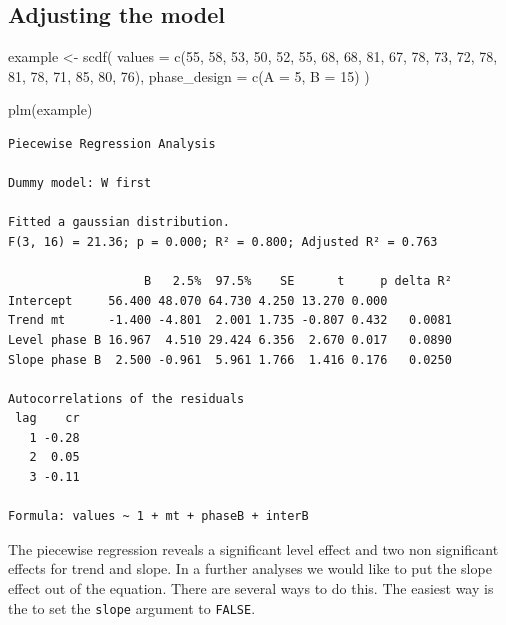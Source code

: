 \documentclass[
  letterpaper,
  DIV=11,
  numbers=noendperiod]{scrreprt}
\newenvironment{Shaded}{\begin{snugshade}}{\end{snugshade}}
\newcommand{\AttributeTok}[1]{\textcolor[rgb]{0.40,0.45,0.13}{#1}}
\newcommand{\DecValTok}[1]{\textcolor[rgb]{0.68,0.00,0.00}{#1}}
\newcommand{\FunctionTok}[1]{\textcolor[rgb]{0.28,0.35,0.67}{#1}}
\newcommand{\NormalTok}[1]{\textcolor[rgb]{0.00,0.23,0.31}{#1}}
\newcommand{\OtherTok}[1]{\textcolor[rgb]{0.00,0.23,0.31}{#1}}
\begin{document}
\hypertarget{adjusting-the-model}{%
\subsection{Adjusting the model}\label{adjusting-the-model}}

\begin{Shaded}
\begin{Highlighting}[]
\NormalTok{example }\OtherTok{\textless{}{-}} \FunctionTok{scdf}\NormalTok{(}
   \AttributeTok{values =} \FunctionTok{c}\NormalTok{(}\DecValTok{55}\NormalTok{, }\DecValTok{58}\NormalTok{, }\DecValTok{53}\NormalTok{, }\DecValTok{50}\NormalTok{, }\DecValTok{52}\NormalTok{, }\DecValTok{55}\NormalTok{, }\DecValTok{68}\NormalTok{, }\DecValTok{68}\NormalTok{, }\DecValTok{81}\NormalTok{, }\DecValTok{67}\NormalTok{, }\DecValTok{78}\NormalTok{, }\DecValTok{73}\NormalTok{, }\DecValTok{72}\NormalTok{, }\DecValTok{78}\NormalTok{, }\DecValTok{81}\NormalTok{, }\DecValTok{78}\NormalTok{, }\DecValTok{71}\NormalTok{, }\DecValTok{85}\NormalTok{, }\DecValTok{80}\NormalTok{, }\DecValTok{76}\NormalTok{),}
   \AttributeTok{phase\_design =} \FunctionTok{c}\NormalTok{(}\AttributeTok{A =} \DecValTok{5}\NormalTok{, }\AttributeTok{B =} \DecValTok{15}\NormalTok{)}
\NormalTok{)}

\FunctionTok{plm}\NormalTok{(example)}
\end{Highlighting}
\end{Shaded}

\begin{verbatim}
Piecewise Regression Analysis

Dummy model: W first

Fitted a gaussian distribution.
F(3, 16) = 21.36; p = 0.000; R² = 0.800; Adjusted R² = 0.763

                   B   2.5%  97.5%    SE      t     p delta R²
Intercept     56.400 48.070 64.730 4.250 13.270 0.000         
Trend mt      -1.400 -4.801  2.001 1.735 -0.807 0.432   0.0081
Level phase B 16.967  4.510 29.424 6.356  2.670 0.017   0.0890
Slope phase B  2.500 -0.961  5.961 1.766  1.416 0.176   0.0250

Autocorrelations of the residuals
 lag    cr
   1 -0.28
   2  0.05
   3 -0.11

Formula: values ~ 1 + mt + phaseB + interB
\end{verbatim}

The piecewise regression reveals a significant level effect and two non
significant effects for trend and slope. In a further analyses we would
like to put the slope effect out of the equation. There are several ways
to do this. The easiest way is the to set the \texttt{slope} argument to
\texttt{FALSE}.
\end{document}

